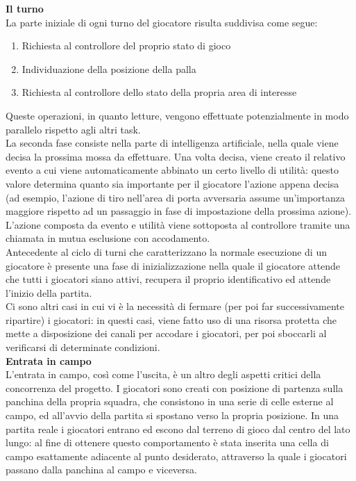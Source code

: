\textbf{Il turno}\\

La parte iniziale di ogni turno del giocatore risulta suddivisa come segue:

\begin{enumerate}
	\item Richiesta al controllore del proprio stato di gioco
	\item Individuazione della posizione della palla
	\item Richiesta al controllore dello stato della propria area di interesse
\end{enumerate}

Queste operazioni, in quanto letture, vengono effettuate potenzialmente in modo parallelo rispetto agli altri task.\\

La seconda fase consiste nella parte di intelligenza artificiale, nella quale viene decisa la prossima mossa da effettuare. Una volta decisa, viene creato il relativo evento a cui viene automaticamente abbinato un certo livello di utilità: questo valore determina quanto sia importante per il giocatore l'azione appena decisa (ad esempio, l'azione di tiro nell'area di porta avversaria assume un'importanza maggiore rispetto ad un passaggio in fase di impostazione della prossima azione). L'azione composta da evento e utilità viene sottoposta al controllore tramite una chiamata in mutua esclusione con accodamento.\\

Antecedente al ciclo di turni che caratterizzano la normale esecuzione di un giocatore è presente una fase di inizializzazione nella quale il giocatore attende che tutti i giocatori siano attivi, recupera il proprio identificativo ed attende l'inizio della partita.\\

Ci sono altri casi in cui vi è la necessità di fermare (per poi far successivamente ripartire) i giocatori: in questi casi, viene fatto uso di una risorsa protetta che mette a disposizione dei canali per accodare i giocatori, per poi sboccarli al verificarsi di determinate condizioni.\\

\textbf{Entrata in campo}\\

L'entrata in campo, così come l'uscita, è un altro degli aspetti critici della concorrenza del progetto. I giocatori sono creati con posizione di partenza sulla panchina della propria squadra, che consistono in una serie di celle esterne al campo, ed all'avvio della partita si spostano verso la propria posizione. In una partita reale i giocatori entrano ed escono dal terreno di gioco dal centro del lato lungo: al fine di ottenere questo comportamento è stata inserita una cella di campo esattamente adiacente al punto desiderato, attraverso la quale i giocatori passano dalla panchina al campo e viceversa.\\

